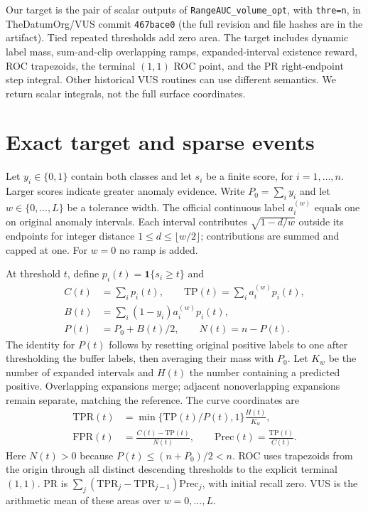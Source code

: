 \documentclass[10pt]{article}
\newcommand{\ind}{\mathbf{1}}
\newcommand{\TP}{\mathrm{TP}}
\newcommand{\TPR}{\mathrm{TPR}}
\newcommand{\FPR}{\mathrm{FPR}}
\newcommand{\Prec}{\mathrm{Prec}}
\begin{document}
Our target is the pair of scalar outputs of
\texttt{RangeAUC\_volume\_opt}, with \texttt{thre=n}, in TheDatumOrg/VUS commit
\texttt{467bace0} (the full revision and file hashes are in the artifact).
Tied repeated thresholds add
zero area. The target includes dynamic label mass, sum-and-clip overlapping
ramps, expanded-interval existence reward, ROC trapezoids, the terminal
$(1,1)$ ROC point, and the PR right-endpoint step integral. Other historical
VUS routines can use different semantics. We return scalar integrals, not the
full surface coordinates.

\section{Exact target and sparse events}
Let $y_i\in\{0,1\}$ contain both classes and let $s_i$ be a finite score, for
$i=1,\ldots,n$. Larger scores indicate greater anomaly evidence. Write
$P_0=\sum_i y_i$ and let $w\in\{0,\ldots,L\}$ be a tolerance width. The
official continuous label $a_i^{(w)}$ equals one on original anomaly intervals.
Each interval contributes $\sqrt{1-d/w}$ outside its endpoints for integer
distance $1\le d\le\lfloor w/2\rfloor$; contributions are summed and capped at
one. For $w=0$ no ramp is added.

At threshold $t$, define $p_i(t)=\ind\{s_i\ge t\}$ and
\begin{align}
 C(t)&=\sum_i p_i(t),\qquad \TP(t)=\sum_i a_i^{(w)}p_i(t),\\
 B(t)&=\sum_i(1-y_i)a_i^{(w)}p_i(t),\\
 P(t)&=P_0+B(t)/2,\qquad N(t)=n-P(t).
\end{align}
The identity for $P(t)$ follows by resetting original positive labels to one
after thresholding the buffer labels, then averaging their mass with $P_0$.
Let $K_w$ be the number of expanded intervals and $H(t)$ the number containing
a predicted positive. Overlapping expansions merge; adjacent nonoverlapping
expansions remain separate, matching the reference. The curve coordinates are
\begin{align}
 \TPR(t)&=\min\{\TP(t)/P(t),1\}\frac{H(t)}{K_w},\\
 \FPR(t)&=\frac{C(t)-\TP(t)}{N(t)},\qquad
 \Prec(t)=\frac{\TP(t)}{C(t)}.
\end{align}
Here $N(t)>0$ because $P(t)\le(n+P_0)/2<n$. ROC uses trapezoids from the origin
through all distinct descending thresholds to the explicit terminal $(1,1)$.
PR is $\sum_j(\TPR_j-\TPR_{j-1})\Prec_j$, with initial recall zero. VUS is
the arithmetic mean of these areas over $w=0,\ldots,L$.
\end{document}
